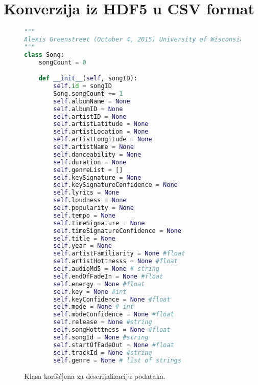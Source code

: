 \section{Konverzija iz HDF5 u CSV format}
\label{sec:DodatakIzvlacenje}

\begin{figure}[h]
\lstset{style=mystyle}
\begin{lstlisting}[language=Python, basicstyle=\footnotesize]
"""
Alexis Greenstreet (October 4, 2015) University of Wisconsin-Madison
"""
class Song:
    songCount = 0

    def __init__(self, songID):
        self.id = songID
        Song.songCount += 1
        self.albumName = None
        self.albumID = None
        self.artistID = None
        self.artistLatitude = None
        self.artistLocation = None
        self.artistLongitude = None
        self.artistName = None
        self.danceability = None
        self.duration = None
        self.genreList = []
        self.keySignature = None
        self.keySignatureConfidence = None
        self.lyrics = None
        self.loudness = None
        self.popularity = None
        self.tempo = None
        self.timeSignature = None
        self.timeSignatureConfidence = None
        self.title = None
        self.year = None
        self.artistFamiliarity = None #float
        self.artistHottnesss = None #float
        self.audioMd5 = None # string
        self.endOfFadeIn = None #float
        self.energy = None #float
        self.key = None #int
        self.keyConfidence = None #float
        self.mode = None # int
        self.modeConfidence = None #float
        self.release = None #string
        self.songHotttness = None #float
        self.songId = None #string
        self.startOfFadeOut = None #float
        self.trackId = None #string
        self.genre = None # list of strings
\end{lstlisting}
\label{code:ConvertToCSV}
\caption{Klasa kori\v{s}\'c{]ena za deserijalizaciju podataka.}}
\end{figure}

